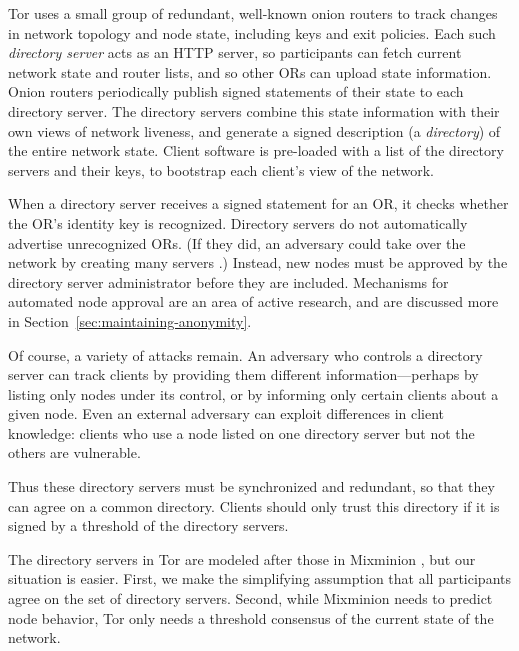 \documentclass[times,10pt,twocolumn]{article}
\begin{document}
Tor uses a small group of redundant, well-known onion routers to
track changes in network topology and node state, including keys and
exit policies.  Each such \emph{directory server} acts as an HTTP
server, so participants can fetch current network state and router
lists, and so other ORs can upload
state information.  Onion routers periodically publish signed
statements of their state to each directory server. The directory servers
combine this state information with their own views of network liveness,
and generate a signed description (a \emph{directory}) of the entire
network state. Client software is
pre-loaded with a list of the directory servers and their keys,
to bootstrap each client's view of the network.

When a directory server receives a signed statement for an OR, it
checks whether the OR's identity key is recognized. Directory
servers do not automatically advertise unrecognized ORs. (If they did,
an adversary could take over the network by creating many servers
\cite{sybil}.) Instead, new nodes must be approved by the directory
server administrator before they are included. Mechanisms for automated
node approval are an area of active research, and are discussed more
in Section~\ref{sec:maintaining-anonymity}.
  
Of course, a variety of attacks remain. An adversary who controls
a directory server can track clients by providing them different
information---perhaps by listing only nodes under its control, or by
informing only certain clients about a given node. Even an external
adversary can exploit differences in client knowledge: clients who use
a node listed on one directory server but not the others are vulnerable.

Thus these directory servers must be synchronized and redundant, so
that they can agree on a common directory.  Clients should only trust
this directory if it is signed by a threshold of the directory
servers.

The directory servers in Tor are modeled after those in Mixminion
\cite{minion-design}, but our situation is easier. First, we make the
simplifying assumption that all participants agree on the set of
directory servers. Second, while Mixminion needs to predict node
behavior, Tor only needs a threshold consensus of the current
state of the network.
\end{document}
